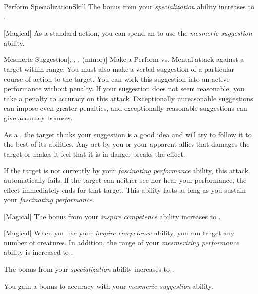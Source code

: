 \begin{feat}{Perform Specialization}{Skill}
         The bonus from your \textit{specialization} ability increases to .

        [Magical] As a standard action, you can spend an  to use the \textit{mesmeric suggestion} ability.
        \begin{ability}{Mesmeric Suggestion}[, , ,  (minor)]
            Make a Perform vs. Mental attack against a target within \rngmed range.
            You must also make a verbal suggestion of a particular course of action to the target.
            You can work this suggestion into an active performance without penalty.
            If your suggestion does not seem reasonable, you take a  penalty to accuracy on this attack.
            Exceptionally unreasonable suggestions can impose even greater penalties, and exceptionally reasonable suggestions can give accuracy bonuses.

            \hit As a , the target thinks your suggestion is a good idea and will try to follow it to the best of its abilities.
            Any act by you or your apparent allies that damages the target or makes it feel that it is in danger breaks the effect.

            If the target is not currently \fascinated by your \textit{fascinating performance} ability, this attack automatically fails.
            If the target can neither see nor hear your performance, the effect immediately ends for that target.
            This ability lasts as long as you sustain your \textit{fascinating performance}.
        \end{ability}

        [Magical] The bonus from your \textit{inspire competence} ability increases to .

        [Magical] When you use your \textit{inspire competence} ability, you can target any number of creatures.
        In addition, the range of your \textit{mesmerizing performance} ability is increased to \rnglong.

         The bonus from your \textit{specialization} ability increases to .

         You gain a  bonus to accuracy with your \textit{mesmeric suggestion} ability.
    \end{feat}

